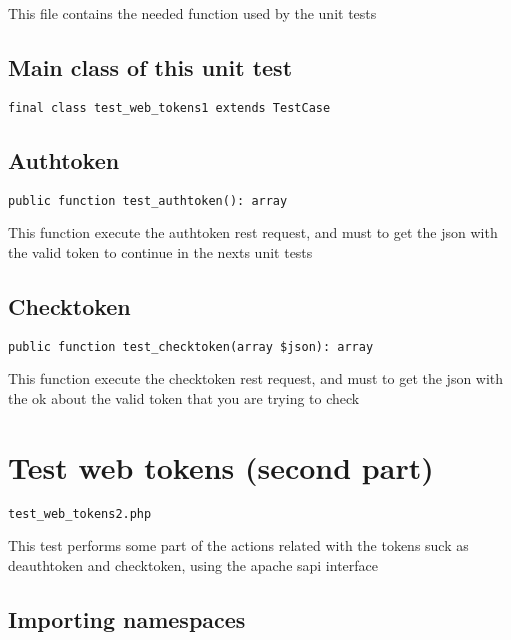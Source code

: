 \documentclass[a4paper]{book}
\begin{document}
This file contains the needed function used by the unit tests

\hypertarget{toc80}{}
\subsection{Main class of this unit test}

\begin{lstlisting}
final class test_web_tokens1 extends TestCase
\end{lstlisting}

\hypertarget{toc81}{}
\subsection{Authtoken}

\begin{lstlisting}
public function test_authtoken(): array
\end{lstlisting}

This function execute the authtoken rest request, and must to get the
json with the valid token to continue in the nexts unit tests

\hypertarget{toc82}{}
\subsection{Checktoken}

\begin{lstlisting}
public function test_checktoken(array $json): array
\end{lstlisting}

This function execute the checktoken rest request, and must to get the
json with the ok about the valid token that you are trying to check

\hypertarget{toc83}{}
\section{Test web tokens (second part)}

\begin{lstlisting}
test_web_tokens2.php
\end{lstlisting}

This test performs some part of the actions related with the tokens suck
as deauthtoken and checktoken, using the apache sapi interface

\hypertarget{toc84}{}
\subsection{Importing namespaces}
\end{document}
